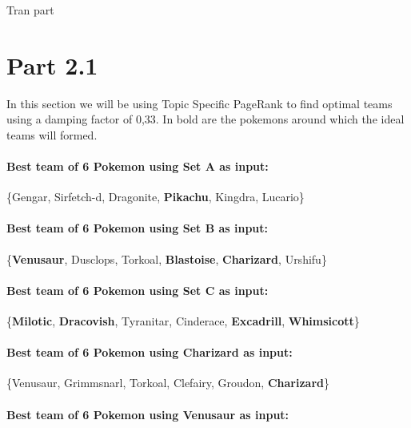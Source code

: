 \documentclass[10pt]{article}
\begin{document}
Tran part

\newpage

\section{Part 2.1}

In this section we will be using Topic Specific PageRank to find optimal teams using a damping factor of 0,33. In bold are the pokemons around which the ideal teams will formed.

\paragraph{Best team of 6 Pokemon using Set A as input:}

\begin{center}
\{Gengar, Sirfetch-d, Dragonite, \textbf{Pikachu}, Kingdra, Lucario\}
\end{center}

\paragraph{Best team of 6 Pokemon using Set B as input:}

\begin{center}
\{\textbf{Venusaur}, Dusclops, Torkoal, \textbf{Blastoise}, \textbf{Charizard}, Urshifu\}
\end{center}

\paragraph{Best team of 6 Pokemon using Set C as input:}

\begin{center}
\{\textbf{Milotic}, \textbf{Dracovish}, Tyranitar, Cinderace, \textbf{Excadrill}, \textbf{Whimsicott}\}
\end{center}

\paragraph{Best team of 6 Pokemon using Charizard as input:}

\begin{center}
\{Venusaur, Grimmsnarl, Torkoal, Clefairy, Groudon, \textbf{Charizard}\}
\end{center}

\paragraph{Best team of 6 Pokemon using Venusaur as input:}
\end{document}
